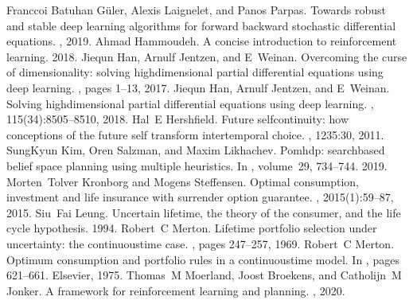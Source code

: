 \documentclass[letterpaper,10pt,english]{jupyterBook}
\begin{document}
\begin{sphinxthebibliography}{Franccoi}
\sphinxAtStartPar
Batuhan Güler, Alexis Laignelet, and Panos Parpas. Towards robust and stable deep learning algorithms for forward backward stochastic differential equations. , 2019.
\sphinxAtStartPar
Ahmad Hammoudeh. A concise introduction to reinforcement learning. 2018.
\sphinxAtStartPar
Jiequn Han, Arnulf Jentzen, and E Weinan. Overcoming the curse of dimensionality: solving high\sphinxhyphen{}dimensional partial differential equations using deep learning. , pages 1–13, 2017.
\sphinxAtStartPar
Jiequn Han, Arnulf Jentzen, and E Weinan. Solving high\sphinxhyphen{}dimensional partial differential equations using deep learning. , 115(34):8505–8510, 2018.
\sphinxAtStartPar
Hal E Hershfield. Future self\sphinxhyphen{}continuity: how conceptions of the future self transform intertemporal choice. , 1235:30, 2011.
\sphinxAtStartPar
Sung\sphinxhyphen{}Kyun Kim, Oren Salzman, and Maxim Likhachev. Pomhdp: search\sphinxhyphen{}based belief space planning using multiple heuristics. In , volume 29, 734–744. 2019.
\sphinxAtStartPar
Morten Tolver Kronborg and Mogens Steffensen. Optimal consumption, investment and life insurance with surrender option guarantee. , 2015(1):59–87, 2015.
\sphinxAtStartPar
Siu Fai Leung. Uncertain lifetime, the theory of the consumer, and the life cycle hypothesis. 1994.
\sphinxAtStartPar
Robert C Merton. Lifetime portfolio selection under uncertainty: the continuous\sphinxhyphen{}time case. , pages 247–257, 1969.
\sphinxAtStartPar
Robert C Merton. Optimum consumption and portfolio rules in a continuous\sphinxhyphen{}time model. In , pages 621–661. Elsevier, 1975.
\sphinxAtStartPar
Thomas M Moerland, Joost Broekens, and Catholijn M Jonker. A framework for reinforcement learning and planning. , 2020.

\end{sphinxthebibliography}
\end{document}
